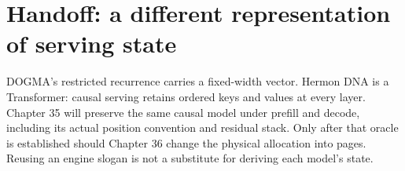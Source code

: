 \section{Handoff: a different representation of serving state}
DOGMA's restricted recurrence carries a fixed-width vector. Hermon DNA is a
Transformer: causal serving retains ordered keys and values at every layer.
Chapter 35 will preserve the same causal model under prefill and decode,
including its actual position convention and residual stack. Only after that
oracle is established should Chapter 36 change the physical allocation into
pages. Reusing an engine slogan is not a substitute for deriving each model's
state.
